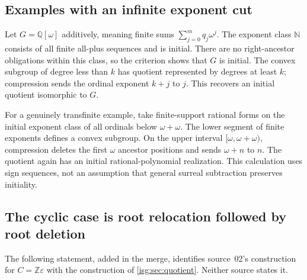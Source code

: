 \documentclass[11pt]{article}
\theoremstyle{definition}
\theoremstyle{remark}
\newcommand{\Z}{\mathbb{Z}}
\newcommand{\N}{\mathbb{N}}
\newcommand{\Q}{\mathbb{Q}}
\begin{document}
\subsection{Examples with an infinite exponent cut}\label{isg:cf:sec:cutexamples}
Let $G=\Q[\omega]$ additively, meaning finite sums
$\sum_{j=0}^{m}q_j\omega^j$. The exponent class $\N$ consists of
all finite all-plus sequences and is initial. There are no right-ancestor
obligations within this class, so the criterion shows that $G$ is
initial. The convex subgroup of degree less than $k$ has quotient
represented by degrees at least $k$; compression sends the ordinal
exponent $k+j$ to $j$. This recovers an initial quotient isomorphic to
$G$.

For a genuinely transfinite example, take finite-support rational forms
on the initial exponent class of all ordinals below $\omega+\omega$.
The lower segment of finite exponents defines a convex subgroup. On the
upper interval $[\omega,\omega+\omega)$, compression deletes the first
$\omega$ ancestor positions and sends $\omega+n$ to $n$. The quotient
again has an initial rational-polynomial realization. This calculation
uses sign sequences, not an assumption that general surreal subtraction
preserves initiality.

\subsection{The cyclic case is root relocation followed by root deletion}
\label{isg:cf:sec:cyclic}
The following statement, added in the merge, identifies source~02's
construction for $C=\Z\varepsilon$ with the construction of
\cref{isg:sec:quotient}. Neither source states it.
\end{document}
